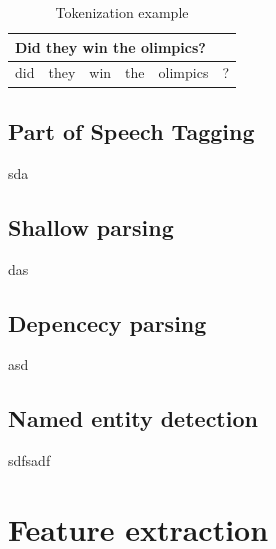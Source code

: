 \documentclass{bsu-ms}
\begin{document}
\begin{table}[h]
\centering
\begin{tabular}{|l|l|l|l|l|l|}
\hline
\multicolumn{6}{|l|}{Did they win the olimpics?} \\ \hline
did & they & win & the & olimpics & ? \\ \hline
\end{tabular}
\caption{Tokenization example}
\label{tab:tokenization}
\end{table}



\subsection{Part of Speech Tagging}
sda
\subsection{Shallow parsing}
das
\subsection{Depencecy parsing}
asd
\subsection{Named entity detection}
sdfsadf
\section{Feature extraction}
\label{sec:featureExtraction}
\end{document}
